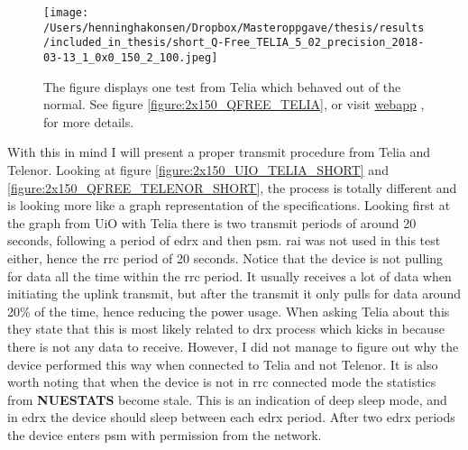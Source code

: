 \documentclass[USenglish]{ifimaster}  %
\begin{document}
\begin{figure}[H]
  \centering
  \texttt{[image: /Users/henninghakonsen/Dropbox/Masteroppgave/thesis/results/included\_in\_thesis/short\_Q-Free\_TELIA\_5\_02\_precision\_2018-03-13\_1\_0x0\_150\_2\_100.jpeg]}
  \caption[Short-term test - unusual behavior, Telia]{The figure displays one test from Telia which behaved out of the normal. See figure \vref{figure:2x150_QFREE_TELIA}, or visit \href{http://158.39.77.97:9000/\#/results/Q-Free\_TELIA\_5.02\_precision\_2018-03-13\_1\_0x0\_150\_2\_100}{webapp} \cite{online:result0}, for more details.}
  \label{figure:2x150_QFREE_TELIA_SHORT}
\end{figure}

With this in mind I will present a proper transmit procedure from Telia and Telenor. Looking at figure \vref{figure:2x150_UIO_TELIA_SHORT} and \vref{figure:2x150_QFREE_TELENOR_SHORT}, the process is totally different and is looking more like a graph representation of the specifications. Looking first at the graph from UiO with Telia there is two transmit periods of around 20 seconds, following a period of \acrshort{edrx} and then \acrshort{psm}. \acrshort{rai} was not used in this test either, hence the \acrshort{rrc} period of 20 seconds. Notice that the device is not pulling for data all the time within the \acrshort{rrc} period. It usually receives a lot of data when initiating the uplink transmit, but after the transmit it only pulls for data around 20\% of the time, hence reducing the power usage. When asking Telia about this they state that this is most likely related to \acrshort{drx} process which kicks in because there is not any data to receive\cite{email:telia}. However, I did not manage to figure out why the device performed this way when connected to Telia and not Telenor.
It is also worth noting that when the device is not in \acrshort{rrc} connected mode the statistics from \textbf{NUESTATS} become stale. This is an indication of deep sleep mode, and in \acrshort{edrx} the device should sleep between each \acrshort{edrx} period. After two \acrshort{edrx} periods the device enters \acrshort{psm} with permission from the network.
\end{document}
